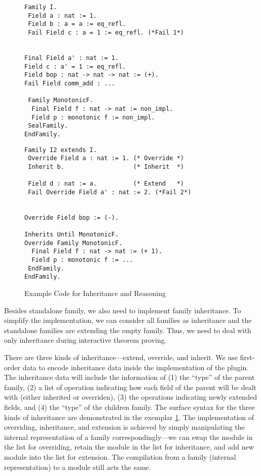 \begin{figure}[!htb]
  \begin{minipage}[t]{0.45\linewidth}
\begin{verbatim}
Family I.
 Field a : nat := 1.
 Field b : a = a := eq_refl.
 Fail Field c : a = 1 := eq_refl. (*Fail 1*)


Final Field a' : nat := 1.
Field c : a' = 1 := eq_refl.
Field bop : nat -> nat -> nat := (+).
Fail Field comm_add : ...

 Family MonotonicF.
  Final Field f : nat -> nat := non_impl.
  Field p : monotonic f := non_impl.
 SealFamily. 
EndFamily.
\end{verbatim}
  \end{minipage}
\begin{minipage}[t]{0.45\linewidth}
\begin{verbatim}
Family I2 extends I.
 Override Field a : nat := 1. (* Override *)
 Inherit b.                   (* Inherit  *)

 Field d : nat := a.          (* Extend   *)
 Fail Override Field a' : nat := 2. (*Fail 2*)


Override Field bop := (-).

Inherits Until MonotonicF.
Override Family MonotonicF.
  Final Field f : nat -> nat := (+ 1).
  Field p : monotonic f := ...
 EndFamily. 
EndFamily.
\end{verbatim}
  \end{minipage}
  \caption{Example Code for Inheritance and Reasoning}\label{fig:plugin-example3}
\end{figure}

Besides standalone family, we also need to implement family inheritance.
To simplify the implementation, we can consider all families as
inheritance and the standalone families are extending the empty family.
Thus, we need to deal with only inheritance during interactive theorem proving.


There are three kinds of inheritance---extend, override, and inherit. We
use first-order data to encode inheritance data inside the
implementation of the plugin. The inheritance data will include the
information of (1) the ``type'' of the parent family, (2) a list of
operation indicating how each field of the parent will be dealt with
(either inherited or overriden), (3) the operations indicating newly
extended fields, and (4) the ``type'' of the children family.
The surface syntax for the three kinds of inheritance
are demonstrated in the exemplar \cref*{fig:plugin-example3}. The
implementation of overriding, inheritance, and extension is achieved by
simply manipulating the internal representation of a family
correspondingly---we can swap the module in the list for overriding,
retain the module in the list for inheritance, and add new module into
the list for extension. The compilation from a family (internal
representation) to a module still acts the same.

